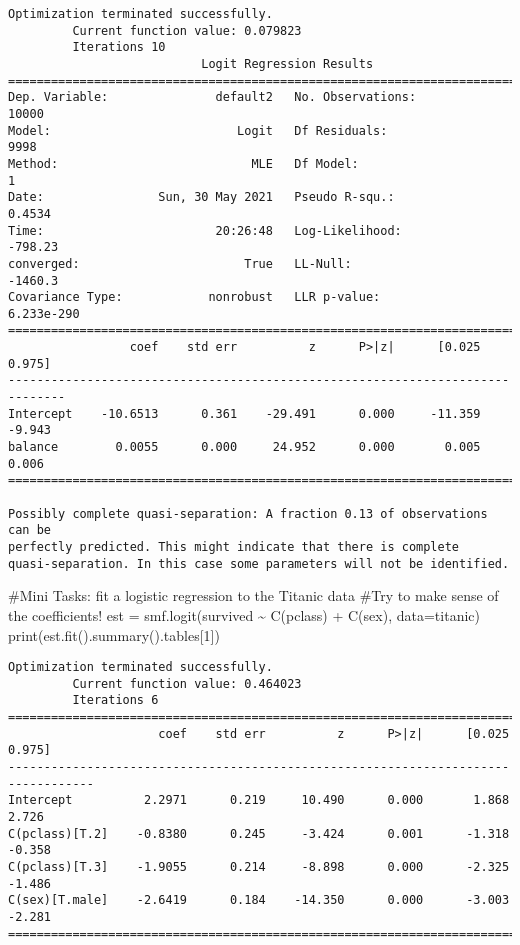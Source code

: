 \documentclass[
  letterpaper,
  DIV=11,
  numbers=noendperiod]{scrreprt}
\newenvironment{Shaded}{\begin{snugshade}}{\end{snugshade}}
\newcommand{\BuiltInTok}[1]{\textcolor[rgb]{0.00,0.23,0.31}{#1}}
\newcommand{\CommentTok}[1]{\textcolor[rgb]{0.37,0.37,0.37}{#1}}
\newcommand{\DecValTok}[1]{\textcolor[rgb]{0.68,0.00,0.00}{#1}}
\newcommand{\NormalTok}[1]{\textcolor[rgb]{0.00,0.23,0.31}{#1}}
\newcommand{\OperatorTok}[1]{\textcolor[rgb]{0.37,0.37,0.37}{#1}}
\newcommand{\StringTok}[1]{\textcolor[rgb]{0.13,0.47,0.30}{#1}}
\begin{document}
\begin{verbatim}
Optimization terminated successfully.
         Current function value: 0.079823
         Iterations 10
                           Logit Regression Results                           
==============================================================================
Dep. Variable:               default2   No. Observations:                10000
Model:                          Logit   Df Residuals:                     9998
Method:                           MLE   Df Model:                            1
Date:                Sun, 30 May 2021   Pseudo R-squ.:                  0.4534
Time:                        20:26:48   Log-Likelihood:                -798.23
converged:                       True   LL-Null:                       -1460.3
Covariance Type:            nonrobust   LLR p-value:                6.233e-290
==============================================================================
                 coef    std err          z      P>|z|      [0.025      0.975]
------------------------------------------------------------------------------
Intercept    -10.6513      0.361    -29.491      0.000     -11.359      -9.943
balance        0.0055      0.000     24.952      0.000       0.005       0.006
==============================================================================

Possibly complete quasi-separation: A fraction 0.13 of observations can be
perfectly predicted. This might indicate that there is complete
quasi-separation. In this case some parameters will not be identified.
\end{verbatim}

\begin{Shaded}
\begin{Highlighting}[]
\CommentTok{\#Mini Tasks: fit a logistic regression to the Titanic data}
\CommentTok{\#Try to make sense of the coefficients!}
\NormalTok{est }\OperatorTok{=}\NormalTok{ smf.logit(}\StringTok{\textquotesingle{}survived \textasciitilde{}  C(pclass) + C(sex)\textquotesingle{}}\NormalTok{, data}\OperatorTok{=}\NormalTok{titanic)}
\BuiltInTok{print}\NormalTok{(est.fit().summary().tables[}\DecValTok{1}\NormalTok{])}
\end{Highlighting}
\end{Shaded}

\begin{verbatim}
Optimization terminated successfully.
         Current function value: 0.464023
         Iterations 6
==================================================================================
                     coef    std err          z      P>|z|      [0.025      0.975]
----------------------------------------------------------------------------------
Intercept          2.2971      0.219     10.490      0.000       1.868       2.726
C(pclass)[T.2]    -0.8380      0.245     -3.424      0.001      -1.318      -0.358
C(pclass)[T.3]    -1.9055      0.214     -8.898      0.000      -2.325      -1.486
C(sex)[T.male]    -2.6419      0.184    -14.350      0.000      -3.003      -2.281
==================================================================================
\end{verbatim}
\end{document}
